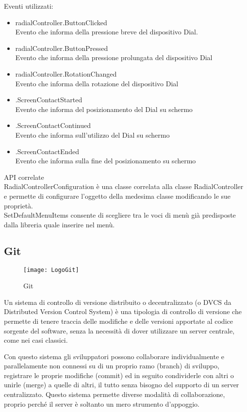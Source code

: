 Eventi utilizzati:
\begin{itemize}
\item radialController.ButtonClicked\\
Evento che informa della pressione breve del dispositivo Dial.
\item radialController.ButtonPressed\\
Evento che informa della pressione prolungata del dispositivo Dial
\item radialController.RotationChanged\\
Evento che informa della rotazione del dispositivo Dial
\item .ScreenContactStarted\\
Evento che informa del posizionamento del Dial su schermo
\item .ScreenContactContinued\\
Evento che informa sull’utilizzo del Dial su schermo
\item .ScreenContactEnded\\
Evento che informa sulla fine del posizionamento su schermo
\end{itemize}
API correlate\\
RadialControllerConfiguration è una classe correlata alla classe RadialController e permette di configurare l’oggetto della medesima classe modificando le sue proprietà.\\
SetDefaultMenuItems consente di scegliere tra le voci di menù già predisposte dalla libreria quale inserire nel menù.

\subsection{Git}
\begin{figure}[htpb!]
\center
  \texttt{[image: LogoGit]}
  \caption{Git}
\end{figure}
Un sistema di controllo di versione distribuito o decentralizzato (o DVCS da Distributed Version Control System) è una tipologia di controllo di versione che permette di tenere traccia delle modifiche e delle versioni apportate al codice sorgente del software, senza la necessità di dover utilizzare un server centrale, come nei casi classici.

Con questo sistema gli sviluppatori possono collaborare individualmente e parallelamente non connessi su di un proprio ramo (branch) di sviluppo, registrare le proprie modifiche (commit) ed in seguito condividerle con altri o unirle (merge) a quelle di altri, il tutto senza bisogno del supporto di un server centralizzato. Questo sistema permette diverse modalità di collaborazione, proprio perché il server è soltanto un mero strumento d'appoggio.
